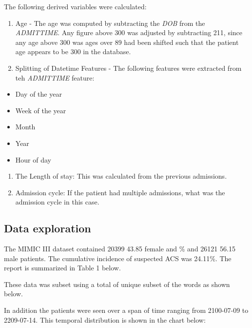 \documentclass[
]{article}
\providecommand{\tightlist}{%
  \setlength{\itemsep}{0pt}\setlength{\parskip}{0pt}}
\begin{document}
The following derived variables were calculated:

\begin{enumerate}
\def\labelenumi{\arabic{enumi}.}
\item
  Age - The age was computed by subtracting the \emph{DOB} from the
  \emph{ADMITTIME}. Any figure above 300 was adjusted by subtracting
  211, since any age above 300 was ages over 89 had been shifted such
  that the patient age appears to be 300 in the database.
\item
  Splitting of Datetime Features - The following features were extracted
  from teh \emph{ADMITTIME} feature:
\end{enumerate}

\begin{itemize}
\tightlist
\item
  Day of the year
\item
  Week of the year
\item
  Month
\item
  Year
\item
  Hour of day
\end{itemize}

\begin{enumerate}
\def\labelenumi{\arabic{enumi}.}
\setcounter{enumi}{2}
\item
  The Length of stay: This was calculated from the previous admissions.
\item
  Admission cycle: If the patient had multiple admissions, what was the
  admission cycle in this case.
\end{enumerate}

\hypertarget{data-exploration}{%
\subsection{Data exploration}\label{data-exploration}}

The MIMIC III dataset contained 20399 43.85 female and \% and 26121
56.15 male patients. The cumulative incidence of suspected ACS was
24.11\%. The report is summarized in Table 1 below.

These data was subset using a total of unique subset of the words as
shown below.

In addition the patients were seen over a span of time ranging from
2100-07-09 to 2209-07-14. This temporal distribution is shown in the
chart below:
\end{document}
